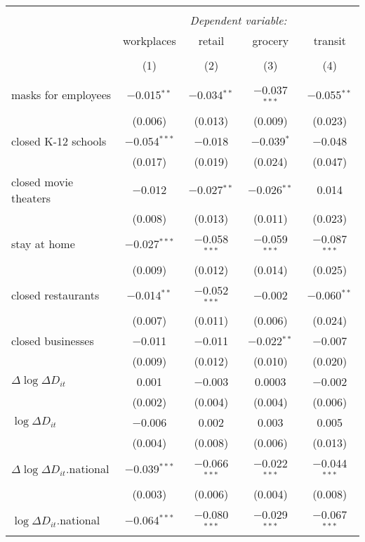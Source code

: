 \begin{tabular}{@{\extracolsep{1pt}}lcccc} 
\\[-1.8ex]\hline 
\hline \\[-1.8ex] 
 & \multicolumn{4}{c}{\textit{Dependent variable:}} \\ 
\cline{2-5} 
 & workplaces & retail & grocery & transit \\ 
\\[-1.8ex] & (1) & (2) & (3) & (4)\\ 
\hline \\[-1.8ex] 
 masks for employees & $-$0.015$^{**}$ & $-$0.034$^{**}$ & $-$0.037$^{***}$ & $-$0.055$^{**}$ \\ 
  & (0.006) & (0.013) & (0.009) & (0.023) \\ 
  closed K-12 schools & $-$0.054$^{***}$ & $-$0.018 & $-$0.039$^{*}$ & $-$0.048 \\ 
  & (0.017) & (0.019) & (0.024) & (0.047) \\ 
  closed movie theaters & $-$0.012 & $-$0.027$^{**}$ & $-$0.026$^{**}$ & 0.014 \\ 
  & (0.008) & (0.013) & (0.011) & (0.023) \\ 
  stay at home & $-$0.027$^{***}$ & $-$0.058$^{***}$ & $-$0.059$^{***}$ & $-$0.087$^{***}$ \\ 
  & (0.009) & (0.012) & (0.014) & (0.025) \\ 
  closed restaurants & $-$0.014$^{**}$ & $-$0.052$^{***}$ & $-$0.002 & $-$0.060$^{**}$ \\ 
  & (0.007) & (0.011) & (0.006) & (0.024) \\ 
  closed businesses & $-$0.011 & $-$0.011 & $-$0.022$^{**}$ & $-$0.007 \\ 
  & (0.009) & (0.012) & (0.010) & (0.020) \\ 
  $\Delta \log \Delta D_{it}$ & 0.001 & $-$0.003 & 0.0003 & $-$0.002 \\ 
  & (0.002) & (0.004) & (0.004) & (0.006) \\ 
  $\log \Delta D_{it}$ & $-$0.006 & 0.002 & 0.003 & 0.005 \\ 
  & (0.004) & (0.008) & (0.006) & (0.013) \\ 
  $\Delta \log \Delta D_{it}$.national & $-$0.039$^{***}$ & $-$0.066$^{***}$ & $-$0.022$^{***}$ & $-$0.044$^{***}$ \\ 
  & (0.003) & (0.006) & (0.004) & (0.008) \\ 
  $\log \Delta D_{it}$.national & $-$0.064$^{***}$ & $-$0.080$^{***}$ & $-$0.029$^{***}$ & $-$0.067$^{***}$ \\ 

\end{tabular}
